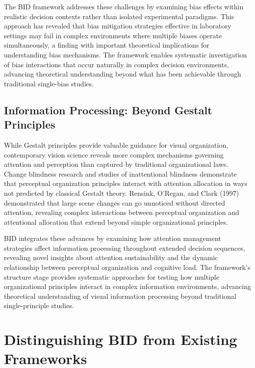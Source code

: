 \documentclass[
  authoryear,
  preprint]{elsarticle}
\begin{document}
The BID framework addresses these challenges by examining bias effects
within realistic decision contexts rather than isolated experimental
paradigms. This approach has revealed that bias mitigation strategies
effective in laboratory settings may fail in complex environments where
multiple biases operate simultaneously, a finding with important
theoretical implications for understanding bias mechanisms. The
framework enables systematic investigation of bias interactions that
occur naturally in complex decision environments, advancing theoretical
understanding beyond what has been achievable through traditional
single-bias studies.

\subsection{Information Processing: Beyond Gestalt
Principles}\label{information-processing-beyond-gestalt-principles}

While Gestalt principles provide valuable guidance for visual
organization, contemporary vision science reveals more complex
mechanisms governing attention and perception than captured by
traditional organizational laws. Change blindness research and studies
of inattentional blindness demonstrate that perceptual organization
principles interact with attention allocation in ways not predicted by
classical Gestalt theory. Rensink, O'Regan, and Clark (1997)
demonstrated that large scene changes can go unnoticed without directed
attention, revealing complex interactions between perceptual
organization and attentional allocation that extend beyond simple
organizational principles.

BID integrates these advances by examining how attention management
strategies affect information processing throughout extended decision
sequences, revealing novel insights about attention sustainability and
the dynamic relationship between perceptual organization and cognitive
load. The framework's structure stage provides systematic approaches for
testing how multiple organizational principles interact in complex
information environments, advancing theoretical understanding of visual
information processing beyond traditional single-principle studies.

\section{Distinguishing BID from Existing
Frameworks}\label{distinguishing-bid-from-existing-frameworks}
\end{document}
